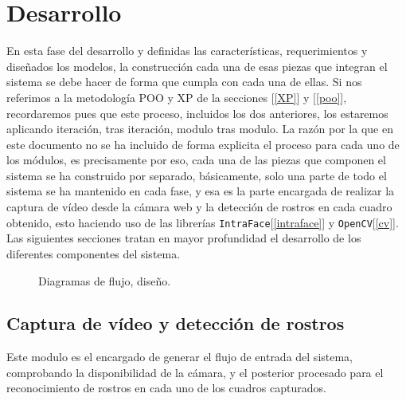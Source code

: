 \documentclass[12pt]{book} %
\begin{document}
\newpage
\section{Desarrollo}
	En esta fase del desarrollo y definidas las características, requerimientos y diseñados los modelos, la construcción  cada una de esas piezas 
	que integran el sistema se debe hacer de forma que cumpla con cada una de ellas. Si nos referimos a la metodología POO y XP de la secciones 
	[\ref{XP}] y [\ref{poo}], recordaremos pues que este proceso, incluidos los dos anteriores, los estaremos aplicando iteración, tras iteración, 
	modulo tras modulo. La razón por la que en este documento no se ha incluido de forma explicita el proceso para cada uno de los módulos, es 
	precisamente por eso, cada una de las piezas que componen el sistema se ha construido por separado, básicamente, solo una parte de todo
	el sistema se ha mantenido en cada fase, y esa es la parte encargada de realizar la captura de vídeo desde la cámara web y la detección de 
	rostros en cada cuadro obtenido, esto haciendo uso de las librerías \texttt{IntraFace}[\ref{intraface}] y \texttt{OpenCV}[\ref{cv}].\\
	
	Las siguientes secciones tratan en mayor profundidad el desarrollo de los diferentes componentes del sistema.
	
	\begin{figure}[t]
		\centering
		\caption{Diagramas de flujo, diseño. \label{f-lenete-uml}}
	\end{figure}	
	\subsection{Captura de vídeo y detección de rostros}
		Este modulo es el encargado de generar el flujo de entrada del sistema, comprobando la disponibilidad de la cámara, y el posterior 
		procesado para el reconocimiento de rostros en cada uno de los cuadros capturados.
		
\end{document}
